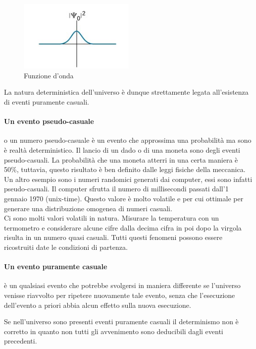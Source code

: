 \documentclass[a4paper, 12pt]{article}
\begin{document}
\begin{figure}[h]
    \centering
    \includegraphics[width=0.5\textwidth]{wavefunction.jpg}
    \caption{Funzione d'onda}
\end{figure}

La natura deterministica dell'universo è dunque strettamente legata all'esistenza di
eventi puramente casuali.

\paragraph{Un evento pseudo-casuale} o un numero pseudo-casuale è un evento
che approssima una probabilità ma sono è realtà deterministico.
Il lancio di un dado o di una moneta sono degli eventi pseudo-casuali.
La probabilità che una moneta atterri in una certa maniera è 50\%, tuttavia,
questo risultato è ben definito dalle leggi fisiche della meccanica. \\
Un altro esempio sono i numeri randomici generati dai computer, essi sono infatti
pseudo-casuali. Il computer sfrutta il numero di millisecondi passati dall'1 gennaio 1970 (unix-time).
Questo valore è molto volatile e per cui ottimale per generare una distribuzione
omogenea di numeri casuali. \\
Ci sono molti valori volatili in natura. Misurare la temperatura con un termometro
e considerare alcune cifre dalla decima cifra in poi dopo la virgola risulta
in un numero quasi casuali.
Tutti questi fenomeni possono essere ricostruiti date le condizioni di partenza.

\paragraph{Un evento puramente casuale} è un qualsiasi evento che potrebbe svolgersi in maniera differente se l'universo venisse riavvolto per ripetere nuovamente tale evento, senza che l'esecuzione dell'evento a priori abbia alcun effetto sulla nuova esecuzione.

Se nell'universo sono presenti eventi puramente casuali il determinismo non è corretto
in quanto non tutti gli avvenimento sono deducibili dagli eventi precedenti.
\end{document}
